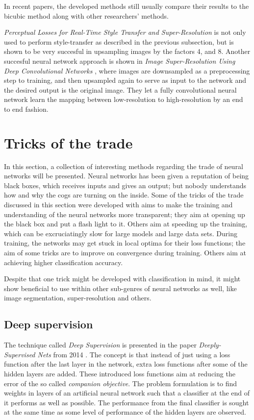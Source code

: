 In recent papers, the developed methods still usually compare their results to the bicubic method along with other researchers' methods.

\emph{Perceptual Losses for Real-Time Style Transfer and Super-Resolution} \citep{Perceptual-losses} is not only used to perform style-transfer as described in the previous subsection, but is shown to be very succesful in upsampling images by the factors 4, and 8. Another succesful neural network approach is shown in \emph{Image Super-Resolution Using Deep Convolutional Networks} \citep{SRCNN}, where images are downsampled as a preprocessing step to training, and then upsampled again to serve as input to the network and the desired output is the original image. They let a fully convolutional neural network learn the mapping between low-resolution to high-resolution by an end to end fashion. 

\section{Tricks of the trade}
In this section, a collection of interesting methods regarding the trade of neural networks will be presented. Neural networks has been given a reputation of being black boxes, which receives inputs and gives an output; but nobody understands how and why the cogs are turning on the inside. Some of the tricks of the trade discussed in this section were developed with aims to make the training and understanding of the neural networks more transparent; they aim at opening up the black box and put a flash light to it. Others aim at speeding up the training, which can be excruciatingly slow for large models and large data sets. During training, the networks may get stuck in local optima for their loss functions; the aim of some tricks are to improve on convergence during training. Others aim at achieving higher classification accuracy. 

Despite that one trick might be developed with classification in mind, it might show beneficial to use within other sub-genres of neural networks as well, like image segmentation, super-resolution and others. 

\subsection{Deep supervision}
The technique called \emph{Deep Supervision} is presented in the paper \emph{Deeply-Supervised Nets} from 2014 \citep{Deep-supervision}. The concept is that instead of just using a loss function after the last layer in the network, extra loss functions after some of the hidden layers are added. These introduced loss functions aim at reducing the error of the so called \emph{companion objective}. The problem formulation is to find weights in layers of an artificial neural network such that a classifier at the end of it performs as well as possible. The performance from the final classifier is sought at the same time as some level of performance of the hidden layers are observed. 

